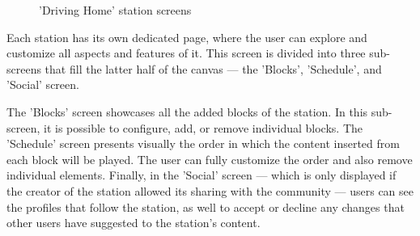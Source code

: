 \begin{figure}[htbp]
	\centering
	 \qquad
	 \qquad
	\caption{'Driving Home' station screens}
	\label{fig:mfp1}
\end{figure}



Each station has its own dedicated page, where the user can explore and customize all aspects and features of it. This screen is divided into three sub-screens that fill the latter half of the canvas — the 'Blocks', 'Schedule', and 'Social' screen.

The 'Blocks' screen showcases all the added blocks of the station. In this sub-screen, it is possible to configure, add, or remove individual blocks. The 'Schedule' screen presents visually the order in which the content inserted from each block will be played. The user can fully customize the order and also remove individual elements. Finally, in the 'Social' screen — which is only displayed if the creator of the station allowed its sharing with the community — users can see the profiles that follow the station, as well to accept or decline any changes that other users have suggested to the station's content.

